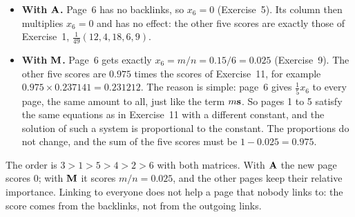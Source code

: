 \begin{itemize}
  \item \textbf{With $\mathbf{A}$.} Page~6 has no backlinks, so $x_6 = 0$ (Exercise~5). Its column then multiplies $x_6 = 0$ and has no effect: the other five scores are exactly those of Exercise~1, $\frac{1}{49}(12,4,18,6,9)$.
  \item \textbf{With $\mathbf{M}$.} Page~6 gets exactly $x_6 = m/n = 0.15/6 = 0.025$ (Exercise~9). The other five scores are $0.975$ times the scores of Exercise~11, for example $0.975 \times 0.237141 = 0.231212$.
  The reason is simple: page~6 gives $\frac{1}{5}x_6$ to every page, the same amount to all, just like the term $m\mathbf{s}$. So pages 1 to 5 satisfy the same equations as in Exercise~11 with a different constant, and the solution of such a system is proportional to the constant. The proportions do not change, and the sum of the five scores must be $1 - 0.025 = 0.975$.
\end{itemize}


The order is $3 > 1 > 5 > 4 > 2 > 6$ with both matrices.
With $\mathbf{A}$ the new page scores $0$; with $\mathbf{M}$ it scores $m/n = 0.025$, and the other pages keep their relative importance.
Linking to everyone does not help a page that nobody links to: the score comes from the backlinks, not from the outgoing links.
